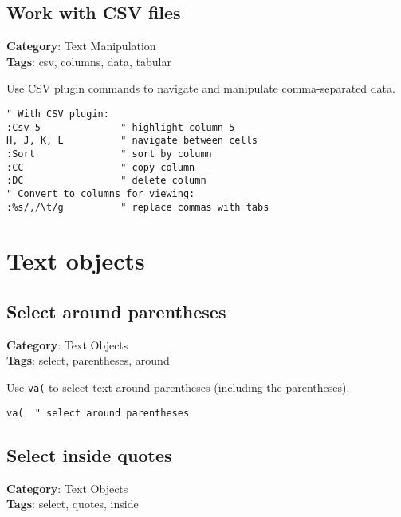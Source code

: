 {{{{{{{{{{{{{{\section{Work with CSV files}

\textbf{Category}: Text Manipulation\\ \textbf{Tags}: csv, columns, data, tabular
\vspace{0.5cm}

Use CSV plugin commands to navigate and manipulate comma-separated data.

\begin{Exa*}{}
\begin{Verbatim}[fontsize=\footnotesize, breaklines, breakanywhere]
" With CSV plugin:
:Csv 5              " highlight column 5
H, J, K, L          " navigate between cells
:Sort               " sort by column
:CC                 " copy column
:DC                 " delete column
" Convert to columns for viewing:
:%s/,/\t/g          " replace commas with tabs
\end{Verbatim}
\end{Exa*}

\chapter{Text objects}
\section{Select around parentheses}

\textbf{Category}: Text Objects\\ \textbf{Tags}: select, parentheses, around
\vspace{0.5cm}

Use {\footnotesize \Verb§va(§} to select text around parentheses (including the parentheses).

\begin{Exa*}{}
\begin{Verbatim}[fontsize=\footnotesize, breaklines, breakanywhere]
va(  " select around parentheses
\end{Verbatim}
\end{Exa*}

\section{Select inside quotes}

\textbf{Category}: Text Objects\\ \textbf{Tags}: select, quotes, inside
\vspace{0.5cm}

}}}}}}}}}}}}}}
